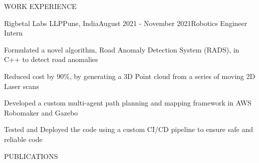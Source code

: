 \documentclass{resume} %
\begin{document}
\begin{rSection}{WORK EXPERIENCE}
	\begin{rProjExpDetails}{Rigbetal Labs LLP}{Pune, India}{August 2021 - November 2021}{Robotics Engineer Intern}{}{}
		\item Formulated a novel algorithm, Road Anomaly Detection System (RADS), in C++ to detect road anomalies
		\item Reduced cost by 90\%, by generating a 3D Point cloud from a series of moving 2D Laser scans
		\item Developed a custom multi-agent path planning and mapping framework in AWS Robomaker and Gazebo
		\item Tested and Deployed the code using a custom CI/CD pipeline to ensure safe and reliable code
	\end{rProjExpDetails}

\end{rSection}
\begin{rSection}{PUBLICATIONS}
	\nocite{*}
	\printbibliography[heading=none]
\end{rSection}
\end{document}
